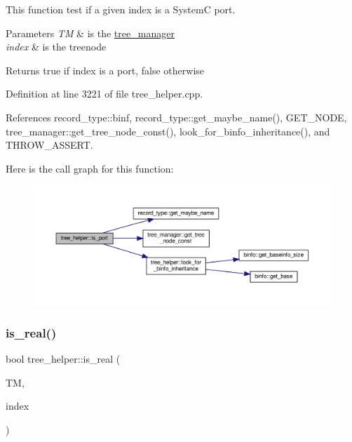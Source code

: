 This function test if a given index is a SystemC port. 


\begin{DoxyParams}{Parameters}
{\em TM} & is the \hyperlink{classtree__manager}{tree\+\_\+manager} \\
\hline
{\em index} & is the treenode \\
\hline
\end{DoxyParams}
\begin{DoxyReturn}{Returns}
true if index is a port, false otherwise 
\end{DoxyReturn}


Definition at line 3221 of file tree\+\_\+helper.\+cpp.



References record\+\_\+type\+::binf, record\+\_\+type\+::get\+\_\+maybe\+\_\+name(), G\+E\+T\+\_\+\+N\+O\+DE, tree\+\_\+manager\+::get\+\_\+tree\+\_\+node\+\_\+const(), look\+\_\+for\+\_\+binfo\+\_\+inheritance(), and T\+H\+R\+O\+W\+\_\+\+A\+S\+S\+E\+RT.

Here is the call graph for this function\+:
\nopagebreak
\begin{figure}[H]
\begin{center}
\leavevmode
\includegraphics[width=350pt]{d7/d99/classtree__helper_ab05d299651f0c54fa25b26b8446c26d5_cgraph}
\end{center}
\end{figure}
\mbox{\label{classtree__helper_a709ed07f7b709f0a6cfd9482aa330414}} 
\subsubsection{\texorpdfstring{is\+\_\+real()}{is\_real()}}
{\footnotesize\ttfamily bool tree\+\_\+helper\+::is\+\_\+real (\begin{DoxyParamCaption}\item[{const \hyperlink{tree__manager_8hpp_a792e3f1f892d7d997a8d8a4a12e39346}{tree\+\_\+manager\+Const\+Ref} \&}]{TM,  }\item[{const unsigned int}]{index }\end{DoxyParamCaption})\hspace{0.3cm}{\ttfamily [static]}}



